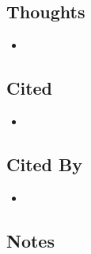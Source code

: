 \documentclass{article}
\begin{document}
\subsection*{Thoughts}
\begin{itemize}
	\item
\end{itemize}

\subsection*{Cited}
\begin{itemize}
	\item
\end{itemize}

\subsection*{Cited By}
\begin{itemize}
	\item
\end{itemize}

\subsection*{Notes}
\end{document}
